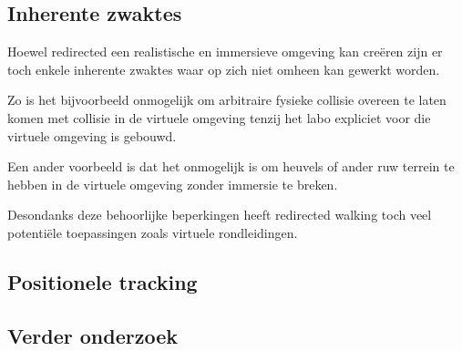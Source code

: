 \documentclass[a4paper,12pt]{article}
\begin{document}
\subsection{Inherente zwaktes}
Hoewel redirected een realistische en immersieve omgeving kan cre\"eren zijn er
toch enkele inherente zwaktes waar op zich niet omheen kan gewerkt worden.

Zo is het bijvoorbeeld onmogelijk om arbitraire fysieke collisie overeen te laten
komen met collisie in de virtuele omgeving tenzij het labo expliciet voor die
virtuele omgeving is gebouwd.

Een ander voorbeeld is dat het onmogelijk is om heuvels of ander ruw terrein te
hebben in de virtuele omgeving zonder immersie te breken.

Desondanks deze behoorlijke beperkingen heeft redirected walking toch veel
potenti\"ele toepassingen zoals virtuele rondleidingen.


\subsection{Positionele tracking}


\subsection{Verder onderzoek}


\newpage


\end{document}
